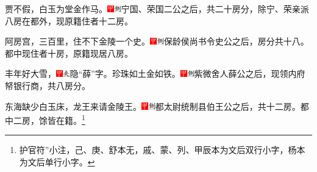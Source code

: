 贾不假，白玉为堂金作马。{\includegraphics[width=3mm]{../Images/00002}\includegraphics[width=3mm]{../Images/00011}\footnotesize \kaishu 宁国、荣国二公之后，共二十房分，除宁、荣亲派八房在都外，现原籍住者十二房。}

阿房宫，三百里，住不下金陵一个史。{\includegraphics[width=3mm]{../Images/00002}\includegraphics[width=3mm]{../Images/00011}\footnotesize \kaishu 保龄侯尚书令史公之后，房分共十八。都中现住者十房，原籍现居八房。}

丰年好大雪，{\includegraphics[width=3mm]{../Images/00002}\includegraphics[width=3mm]{../Images/00012}\footnotesize \kaishu 隐“薛”字。}珍珠如土金如铁。{\includegraphics[width=3mm]{../Images/00002}\includegraphics[width=3mm]{../Images/00011}\footnotesize \kaishu 紫微舍人薛公之后，现领内府帑银行商，共八房分。}

东海缺少白玉床，龙王来请金陵王。{\includegraphics[width=3mm]{../Images/00002}\includegraphics[width=3mm]{../Images/00011}\footnotesize \kaishu 都太尉统制县伯王公之后，共十二房。都中二房，馀皆在籍。}\footnote{护官符”小注，己、庚、舒本无，戚、蒙、列、甲辰本为文后双行小字，杨本为文后单行小字。}

